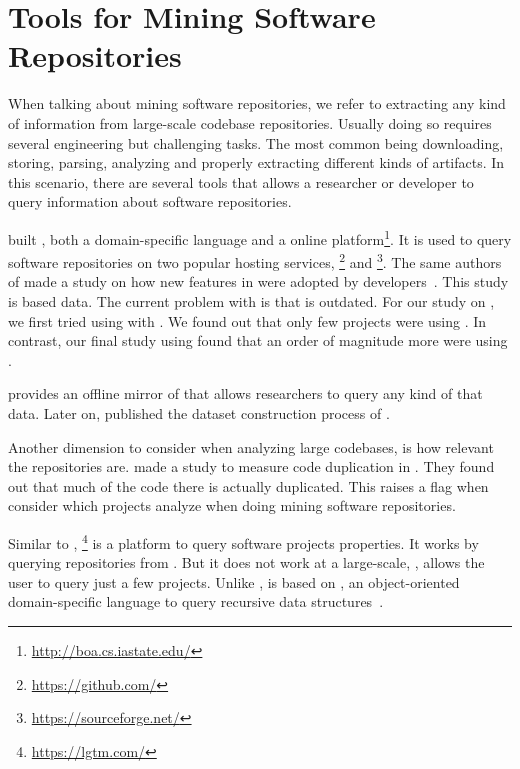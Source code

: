 \section{Tools for Mining Software Repositories} \label{sec:msr}

When talking about mining software repositories, we refer to extracting any kind of information from large-scale codebase repositories.
Usually doing so requires several engineering but challenging tasks.
The most common being downloading, storing, parsing, analyzing and properly extracting different kinds of artifacts.
In this scenario, there are several tools that allows a researcher or developer to query information about software repositories.

\cite{dyer_boa:_2013,dyer_declarative_2013} built \boa{}, both a domain-specific language and a online platform\footnote{\url{http://boa.cs.iastate.edu/}}.
It is used to query software repositories on two popular hosting services, \github{}\footnote{\url{https://github.com/}} and \sourceforge{}\footnote{\url{https://sourceforge.net/}}.
The same authors of \boa{} made a study on how new features in \java{} were adopted by developers~\cite{dyer_mining_2014}.
This study is based \sourceforge{} data.
The current problem with \sourceforge{} is that is outdated.
For our study on \smu{}, we first tried using \boa{} with \sourceforge{}.
We found out that only few projects were using \smu{}.
In contrast, our final study using \maven{} found that an order of magnitude more were using \smu{}.

\cite{gousios_ghtorent_2013}
provides an offline mirror of \github{} that allows researchers to query any kind of that data.
Later on, \cite{gousios_lean_2014} published the dataset construction process of \github{}.

Another dimension to consider when analyzing large codebases, is how relevant the repositories are.
\cite{lopes_dejavu:_2017} made a study to measure code duplication in \github{}.
They found out that much of the code there is actually duplicated.
This raises a flag when consider which projects analyze when doing mining software repositories.

Similar to \boa{}, \lgtm{}\footnote{\url{https://lgtm.com/}} is a platform to query software projects properties.
It works by querying repositories from \github{}.
But it does not work at a large-scale, \ie{}, \lgtm{} allows the user to query just a few projects.
Unlike \boa{}, \lgtm{} is based on \ql{}, an object-oriented domain-specific language to query recursive data structures~\cite{avgustinov_ql:_2016}.

